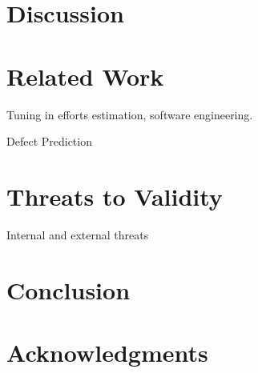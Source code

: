 \documentclass{acm_proc_article-sp}
\begin{document}
\section{Discussion}

\section{Related Work}

Tuning in efforts estimation, software engineering.

Defect Prediction



\section{Threats to Validity}

Internal and external threats

\section{Conclusion}

\section{Acknowledgments}


  
\end{document}
